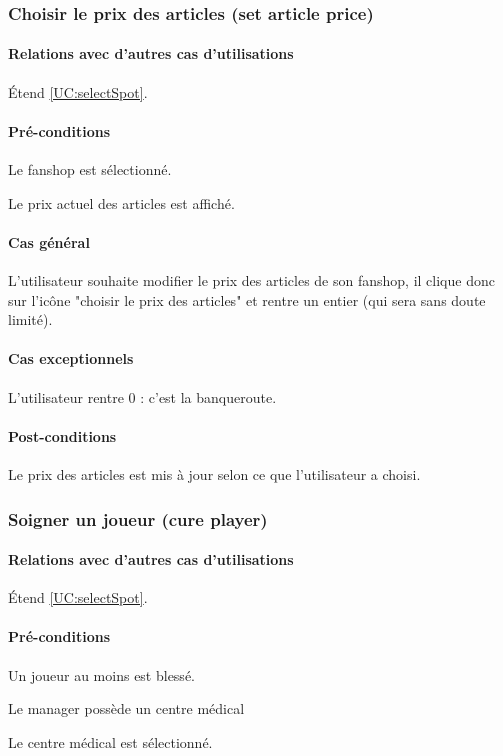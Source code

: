 \subsubsection{Choisir le prix des articles (set article price)}
\label{UC:setArticlePrice}
\paragraph{Relations avec d'autres cas d'utilisations}
Étend \ref{UC:selectSpot}.
\paragraph{Pré-conditions}
\begin{list}{}{\leftmargin=1.5em}
\item{Le fanshop est sélectionné.}
\item{Le prix actuel des articles est affiché.}
\end{list}
\paragraph{Cas général}
L'utilisateur souhaite modifier le prix des articles de son fanshop, il clique donc sur l'icône "choisir le prix des articles" et rentre un entier (qui sera sans doute limité). 
\paragraph{Cas exceptionnels}
L'utilisateur rentre 0 : c'est la banqueroute. 
\paragraph{Post-conditions}
\begin{list}{}{\leftmargin=1.5em}
\item{Le prix des articles est mis à jour selon ce que l'utilisateur a choisi.}
\end{list}


\subsubsection{Soigner un joueur (cure player)}
\label{UC:curePlayer}
\paragraph{Relations avec d'autres cas d'utilisations}
Étend \ref{UC:selectSpot}.
\paragraph{Pré-conditions}
\begin{list}{}{\leftmargin=1.5em}
\item{Un joueur au moins est blessé.}
\item{Le \gls{manager} possède un centre médical}
\item{Le centre médical est sélectionné.}
\end{list}
